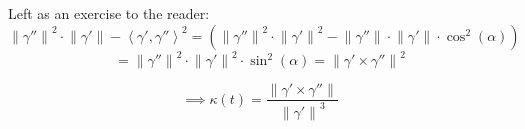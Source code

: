 \documentclass{article}
\newcommand{\angel}[1]{\left\langle#1\right\rangle}
\newcommand{\norm}[1]{\left\|#1\right\|}
\begin{document}
Left as an exercise to the reader:
\[ \norm{\gamma''}^2 \cdot \norm{\gamma'} - \angel{\gamma', \gamma''}^2 = \left(\norm{\gamma''}^2 \cdot \norm{\gamma'}^2 - \norm{\gamma''} \cdot \norm{\gamma'} \cdot \cos^2(\alpha)\right) \]
\[ = \norm{\gamma''}^2 \cdot \norm{\gamma'}^2 \cdot \sin^2(\alpha) = \norm{\gamma' \times \gamma''}^2 \]
\begin{mdframed}
  \[ \implies \kappa(t) = \frac{\norm{\gamma' \times \gamma''}}{\norm{\gamma'}^3} \]
\end{mdframed}


\printindex
\end{document}
